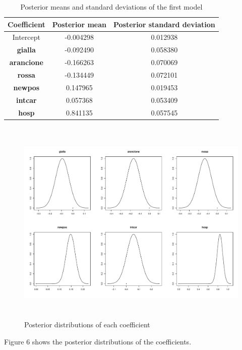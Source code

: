 \documentclass[12pt,a4paper]{article}
\theoremstyle{definition}
\theoremstyle{remark}
\begin{document}
\begin{table}[htb!]
	\centering
	\begin{tabular}{|c|c|c|}
		\hline
		Coefficient          & Posterior mean & Posterior standard deviation \\ \hline
		Intercept          & -0.004298      & 0.012938                     \\ \hline
		\textbf{gialla}    & -0.092490      & 0.058380                     \\ \hline
		\textbf{arancione} & -0.166263      & 0.070069                     \\ \hline
		\textbf{rossa}     & -0.134449      & 0.072101                     \\ \hline
		\textbf{newpos}    & 0.147965       & 0.019453                     \\ \hline
		\textbf{intcar}    & 0.057368       & 0.053409                     \\ \hline
		\textbf{hosp}      & 0.841135       & 0.057545                     \\ \hline
	\end{tabular}
	\caption{Posterior means and standard deviations of the first model}
\end{table}
\begin{figure}[htb!]
	\centering
	\includegraphics[width=140mm, height=100mm,scale=0.5]{posterior_first_model.pdf}
	\caption{Posterior distributions of each coefficient}
\end{figure}


Figure 6 shows the posterior distributions of the coefficients.
\end{document}
